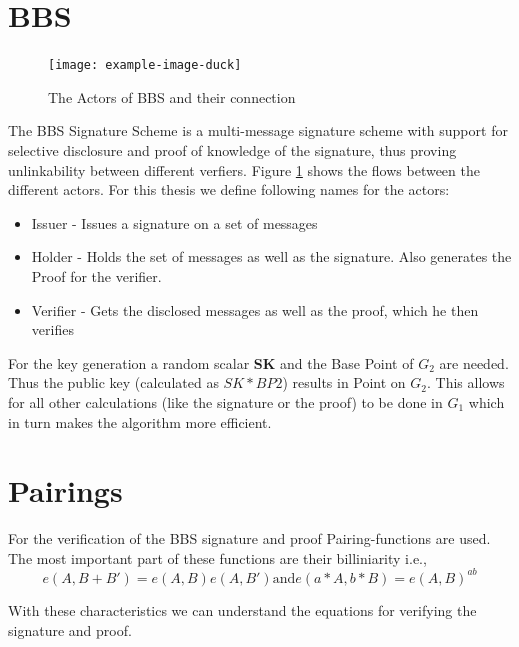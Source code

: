 \documentclass[
	a4paper               %
	,bibliography=totoc   %
	,listof=totoc         %
	,monolingual
	twoside=false,
]{bfhthesis}              %
\begin{document}
\section{BBS}
\label{sec:bbs}
\begin{figure}[h]
    \centering
	\texttt{[image: example-image-duck]}
	\caption{The Actors of BBS and their connection}
	\label{fig:bbstriangle}
\end{figure}
The BBS Signature Scheme \cite{bbs-signature-scheme} is a multi-message signature scheme with support for selective disclosure and proof of knowledge of the signature, thus proving unlinkability between different verfiers. 
Figure \ref{fig:bbstriangle} shows the flows between the different actors.
For this thesis we define following names for the actors:
\begin{itemize}
	\item Issuer - Issues a signature on a set of messages
	\item Holder - Holds the set of messages as well as the signature. Also generates the Proof for the verifier.
	\item Verifier - Gets the disclosed messages as well as the proof, which he then verifies
\end{itemize}
For the key generation a random scalar \textbf{SK} and the Base Point of $G_2$ are needed.
Thus the public key (calculated as $SK*BP2$) results in Point on $G_2$.
This allows for all other calculations (like the signature or the proof) to be done in $G_1$ which in turn makes the algorithm more efficient.


\section{Pairings}
\label{sec:pairing}
For the verification of the BBS signature and proof Pairing-functions are used. The most important part of these functions are their billiniarity i.e.,\newline
\begin{equation}
		e(A, B + B') = e(A, B)e(A, B') \text{and} e(a * A, b * B) = e(A, B)^{ab}
\end{equation}

With these characteristics we can understand the equations for verifying the signature and proof.\newline
\end{document}
